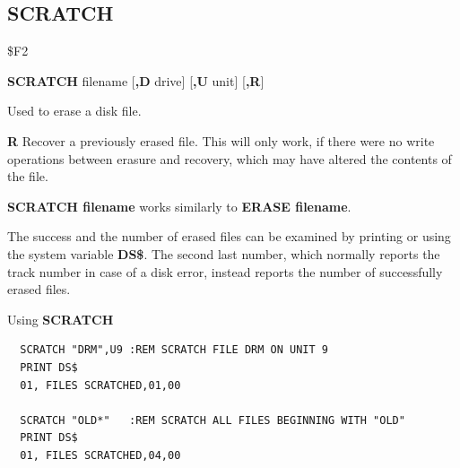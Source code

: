 \subsection{SCRATCH}
\begin{description}[leftmargin=2cm,style=nextline]
\item [Token:] \$F2
\item [Format:] {\bf SCRATCH} filename [{\bf,D} drive] [{\bf,U} unit] [{\bf,R}]
\item [Usage:] Used to erase a disk file.

   \filenamedefinition

   \drivedefinition

   \unitdefinition

   {\bf R} Recover a previously erased file.
   This will only work, if there were no write operations
   between erasure and recovery, which may have altered the
   contents of the file.

\item [Remarks:] {\bf SCRATCH filename} works similarly to
                 {\bf ERASE filename}.

                 The success and the number of erased files can
                 be examined by printing or using the system
                 variable {\bf DS\$}. The second last number, which
                 normally reports the track number in case of a disk error,
                 instead reports the number of successfully erased files.

\item [Examples:] Using {\bf SCRATCH}
\begin{tcolorbox}[colback=black,coltext=white]
\verbatimfont{\codefont}
\begin{verbatim}
  SCRATCH "DRM",U9 :REM SCRATCH FILE DRM ON UNIT 9
  PRINT DS$
  01, FILES SCRATCHED,01,00

  SCRATCH "OLD*"   :REM SCRATCH ALL FILES BEGINNING WITH "OLD"
  PRINT DS$
  01, FILES SCRATCHED,04,00
\end{verbatim}
\end{tcolorbox}
\end{description}


\newpage
